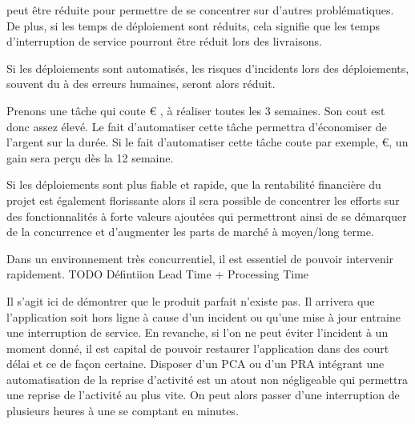 \begin{description}
	\setlength\itemsep{0em}
	\item [La durée de de déploiement] peut être réduite pour permettre de se concentrer sur d'autres problématiques. De plus, si les temps de déploiement sont réduits, cela signifie que les temps d'interruption de service pourront être réduit lors des livraisons.
	\item [Erreur de déploiement] Si les déploiements sont automatisés, les risques d'incidents lors des déploiements, souvent du à des erreurs humaines, seront alors réduit.
	\item [Rentabilité financière] Prenons une tâche qui coute € , à réaliser toutes les 3 semaines. Son cout est donc assez élevé. Le fait d'automatiser cette tâche permettra d'économiser de l'argent sur la durée. Si le fait d'automatiser cette tâche coute par exemple, €, un gain sera perçu dès la 12 semaine.
	\item [Part de marché] Si les déploiements sont plus fiable et rapide, que la rentabilité financière du projet est également florissante alors il sera possible de concentrer les efforts sur des fonctionnalités à forte valeurs ajoutées qui permettront ainsi de se démarquer de la concurrence et d'augmenter les parts de marché à moyen/long terme.
	\item [Lead Time / Processing Time] Dans un environnement très concurrentiel, il est essentiel de pouvoir intervenir rapidement. TODO Défintiion Lead Time + Processing Time 
	\item [Reprise d'activité] Il s'agit ici de démontrer que le produit parfait n'existe pas. Il arrivera que l'application soit hors ligne à cause d'un incident ou qu'une mise à jour entraine une interruption de service. En revanche, si l'on ne peut éviter l'incident à un moment donné, il est capital de pouvoir restaurer l'application dans des court délai et ce de façon certaine. Disposer d'un \gls{PCA} ou d'un \gls{PRA} intégrant une automatisation de la reprise d'activité est un atout non négligeable qui permettra une reprise de l'activité au plus vite. On peut alors passer d'une interruption de plusieurs heures à une se comptant en minutes.
\end{description}

